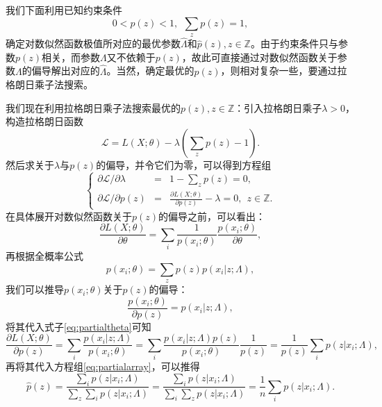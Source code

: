 我们下面利用已知约束条件
\[
   0 < p(z) < 1,~~\sum\limits_z p(z) = 1,
\]
确定对数似然函数极值所对应的最优参数$\hat \Lambda$和$\hat p(z), z\in \mathbb Z$。由于约束条件只与参数$p(z)$相关，而参数$\Lambda$又不依赖于$p(z)$，故此可直接通过对数似然函数关于参数$\Lambda$的偏导解出对应的$\hat \Lambda$。当然，确定最优的$p(z)$，则相对复杂一些，要通过拉格朗日乘子法搜索。

我们现在利用拉格朗日乘子法搜索最优的$p(z), z \in \mathbb Z$：引入拉格朗日乘子$\lambda > 0$，构造拉格朗日函数
\begin{equation}
    \mathscr L = L(X; \theta) - \lambda (\sum\limits_z p(z) - 1).
\end{equation}
然后求关于$\lambda$与$p(z)$的偏导，并令它们为零，可以得到方程组
\begin{equation}\label{eq:partialarray}
    \left\{
        \begin{array}{lcl}
            \partial \mathscr L/\partial \lambda &=& 1 - \sum\limits_z p(z) = 0,\\
            \partial \mathscr L/\partial p(z) &=& \frac{\partial L(X; \theta)}{\partial p(z)} - \lambda = 0, ~~z\in \mathbb Z.
        \end{array}
    \right.
\end{equation}
在具体展开对数似然函数关于$p(z)$的偏导之前，可以看出：
\begin{equation}\label{eq:partialtheta}
    \frac{\partial L(X; \theta)}{\partial \theta} = \sum\limits_i \frac{1}{p(x_i; \theta)} \frac{p(x_i; \theta)}{\partial \theta},
\end{equation}
再根据全概率公式
\[p(x_i; \theta) = \sum\limits_z p(z) p(x_i|z; \Lambda),\]
我们可以推导$p(x_i; \theta)$关于$p(z)$的偏导：
\begin{equation}
    \frac{p(x_i; \theta)}{\partial p(z)} = p(x_i|z; \Lambda),
\end{equation}
将其代入式子\eqref{eq:partialtheta}可知
\[
\frac{\partial L(X; \theta)}{\partial p(z)} = \sum\limits_i \frac{p(x_i|z; \Lambda)}{p(x_i; \theta)}
    = \sum\limits_i \frac{p(x_i|z; \Lambda) p(z)}{p(x_i; \theta)} \frac{1}{p(z)}
    = \frac{1}{p(z)} \sum\limits_i p(z|x_i; \Lambda),
\]
再将其代入方程组\eqref{eq:partialarray}，可以推得
\begin{equation}\label{eq:optimalpz}
    \hat p(z) = \frac{\sum\limits_i p(z|x_i;\Lambda)}{\sum\limits_z\sum\limits_i p(z|x_i;\Lambda)}
    = \frac{\sum\limits_i p(z|x_i;\Lambda)}{\sum\limits_i \sum\limits_z p(z|x_i;\Lambda)}
    = \frac{1}{n} \sum\limits_i p(z|x_i;\Lambda).
\end{equation}

